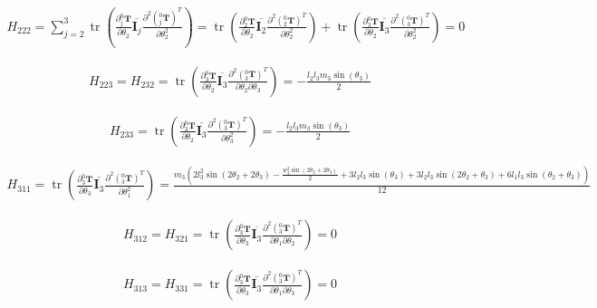 \documentclass{homework}
\begin{document}
\begin{sol}
\begin{align*}
  H_{222} = \sum_{j=2}^3 \operatorname{tr} (\frac{\partial {^0_j}\mathbf{T}}{\partial \theta_2} \overline{\mathbf{I}_j} \frac{\partial^2 ({^0_j}\mathbf{T})^T}{\partial \theta_2^2}) 
          = \operatorname{tr} (\frac{\partial {^0_2}\mathbf{T}}{\partial \theta_2} \overline{\mathbf{I}_2} \frac{\partial^2 ({^0_2}\mathbf{T})^T}{\partial \theta_2^2}) + \operatorname{tr} (\frac{\partial {^0_3}\mathbf{T}}{\partial \theta_2} \overline{\mathbf{I}_3} \frac{\partial^2 ({^0_3}\mathbf{T})^T}{\partial \theta_2^2})
          = 0
\end{align*}

\begin{align*}
  H_{223} = H_{232} = \operatorname{tr} (\frac{\partial {^0_3}\mathbf{T}}{\partial \theta_2} \overline{\mathbf{I}_3} \frac{\partial^2 ({^0_3}\mathbf{T})^T}{\partial \theta_2 \partial \theta_3}) 
                    = -\frac{l_2 l_3 m_3 \sin(\theta_3)}{2}
\end{align*}

\begin{align*}
  H_{233} = \operatorname{tr} (\frac{\partial {^0_3}\mathbf{T}}{\partial \theta_2} \overline{\mathbf{I}_3} \frac{\partial^2 ({^0_3}\mathbf{T})^T}{\partial \theta_3^2}) 
          = -\frac{l_2 l_3 m_3 \sin(\theta_3)}{2}
\end{align*}

\begin{align*}
  H_{311} = \operatorname{tr} (\frac{\partial {^0_3}\mathbf{T}}{\partial \theta_3} \overline{\mathbf{I}_3} \frac{\partial^2 ({^0_3}\mathbf{T})^T}{\partial \theta_1^2}) 
          = \frac{m_3 (2 l_3^2 \sin(2\theta_2 + 2\theta_3) - \frac{w_3^2 \sin(2\theta_2 + 2\theta_3)}{2} + 3 l_2 l_3 \sin(\theta_3) + 3 l_2 l_3 \sin(2\theta_2 + \theta_3) + 6 l_1 l_3 \sin(\theta_2 + \theta_3))}{12}
\end{align*}

\begin{align*}
  H_{312} = H_{321} = \operatorname{tr} (\frac{\partial {^0_3}\mathbf{T}}{\partial \theta_3} \overline{\mathbf{I}_3} \frac{\partial^2 ({^0_3}\mathbf{T})^T}{\partial \theta_1 \partial \theta_2})
                    = 0
\end{align*}

\begin{align*}
  H_{313} = H_{331} = \operatorname{tr} (\frac{\partial {^0_3}\mathbf{T}}{\partial \theta_3} \overline{\mathbf{I}_3} \frac{\partial^2 ({^0_3}\mathbf{T})^T}{\partial \theta_1 \partial \theta_3}) 
                    = 0
\end{align*}


\end{sol}
\end{document}
